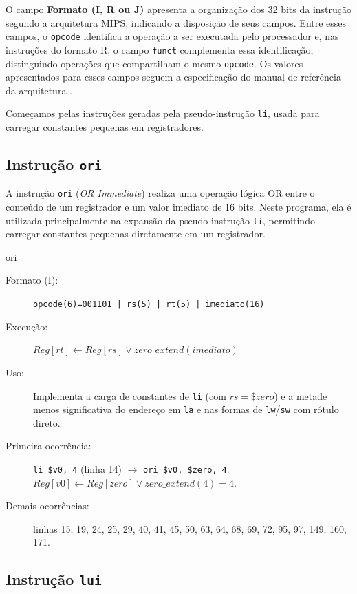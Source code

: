 O campo \textbf{Formato (I, R ou J)} apresenta a organização dos 32 bits da instrução segundo a arquitetura MIPS, indicando a disposição de seus campos. Entre esses campos, o \texttt{opcode} identifica a operação a ser executada pelo processador e, nas instruções do formato R, o campo \texttt{funct} complementa essa identificação, distinguindo operações que compartilham o mesmo \texttt{opcode}. Os valores apresentados para esses campos seguem a especificação do manual de referência da arquitetura \cite{mips2016}.

Começamos pelas instruções geradas pela pseudo-instrução \texttt{li}, usada para carregar constantes pequenas em registradores.



\subsection{Instrução \texttt{ori}}

A instrução \texttt{ori} (\textit{OR Immediate}) realiza uma operação lógica
OR entre o conteúdo de um registrador e um valor imediato de 16 bits. Neste
programa, ela é utilizada principalmente na expansão da pseudo-instrução
\texttt{li}, permitindo carregar constantes pequenas diretamente em um
registrador.

\begin{instrucao}{ori}
\begin{description}
\item[Formato (I):] \texttt{opcode(6)=001101 | rs(5) | rt(5) | imediato(16)}
\item[Execução:] $Reg[rt] \leftarrow Reg[rs] \lor zero\_extend(imediato)$
\item[Uso:] Implementa a carga de constantes de \texttt{li} (com
$rs = \$zero$) e a metade menos significativa do endereço em \texttt{la}
e nas formas de \texttt{lw}/\texttt{sw} com rótulo direto.
\item[Primeira ocorrência:] \texttt{li \$v0, 4} (linha 14)
$\rightarrow$ \texttt{ori \$v0, \$zero, 4}:
$Reg[v0] \leftarrow Reg[zero] \lor zero\_extend(4) = 4$.
\item[Demais ocorrências:] linhas 15, 19, 24, 25, 29, 40, 41, 45, 50,
63, 64, 68, 69, 72, 95, 97, 149, 160, 171.
\end{description}
\end{instrucao}

\subsection{Instrução \texttt{lui}}

